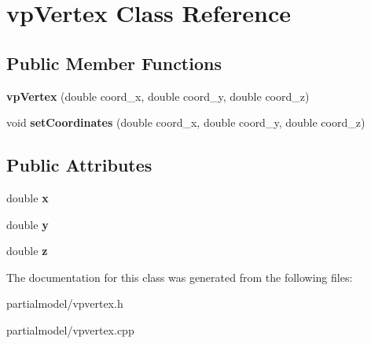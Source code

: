 \hypertarget{classvpVertex}{}\section{vp\+Vertex Class Reference}
\label{classvpVertex}
\subsection*{Public Member Functions}
\begin{DoxyCompactItemize}
\item 
{\bfseries vp\+Vertex} (double coord\+\_\+x, double coord\+\_\+y, double coord\+\_\+z)\hypertarget{classvpVertex_a627586989faad3a010933fe0244771f1}{}\label{classvpVertex_a627586989faad3a010933fe0244771f1}

\item 
void {\bfseries set\+Coordinates} (double coord\+\_\+x, double coord\+\_\+y, double coord\+\_\+z)\hypertarget{classvpVertex_af17a837d95bb5c85fdc8e914c5811b10}{}\label{classvpVertex_af17a837d95bb5c85fdc8e914c5811b10}

\end{DoxyCompactItemize}
\subsection*{Public Attributes}
\begin{DoxyCompactItemize}
\item 
double {\bfseries x}\hypertarget{classvpVertex_af77df39a5035202e8b2dd9b06dbca67a}{}\label{classvpVertex_af77df39a5035202e8b2dd9b06dbca67a}

\item 
double {\bfseries y}\hypertarget{classvpVertex_ac5f67bd42f9d4206e8231d6e0e4ea780}{}\label{classvpVertex_ac5f67bd42f9d4206e8231d6e0e4ea780}

\item 
double {\bfseries z}\hypertarget{classvpVertex_ae06974327c60b5c733daf89a4d1ff4a0}{}\label{classvpVertex_ae06974327c60b5c733daf89a4d1ff4a0}

\end{DoxyCompactItemize}


The documentation for this class was generated from the following files\+:\begin{DoxyCompactItemize}
\item 
partialmodel/vpvertex.\+h\item 
partialmodel/vpvertex.\+cpp\end{DoxyCompactItemize}
